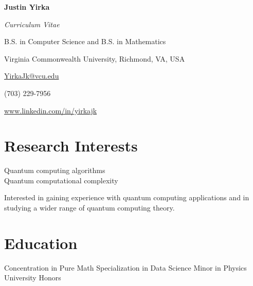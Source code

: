 \documentclass[11pt,letterpaper,serif]{moderncv}
\begin{document}
	
\thispagestyle{firstpage}

\begin{center}
	{\Large\textbf{Justin Yirka}}
	
	\textit{Curriculum Vitae}
	
	B.S. in Computer Science and B.S. in Mathematics
	
	Virginia Commonwealth University, Richmond, VA, USA
	\vspace{\baselineskip}
	
	\href{mailto:yirkajk@vcu.edu}{YirkaJk@vcu.edu}
	
	(703) 229-7956
	
	\url{www.linkedin.com/in/yirkajk}	
\end{center}


\setlength{\parskip}{0.5em}
\setlength\bibitemsep{\parskip}


\section{Research Interests}
Quantum computing algorithms \\
Quantum computational complexity

Interested in gaining experience with quantum computing applications and in studying a wider range of quantum computing theory.


\section{Education}
\vspace{-\baselineskip}\vspace{-\parskip}
{	
	\begin{adjustwidth}{.25in}{}
		Concentration in Pure Math \newline 
		Specialization in Data Science \newline
		Minor in Physics \newline
		University Honors
	\end{adjustwidth}
}
\end{document}
